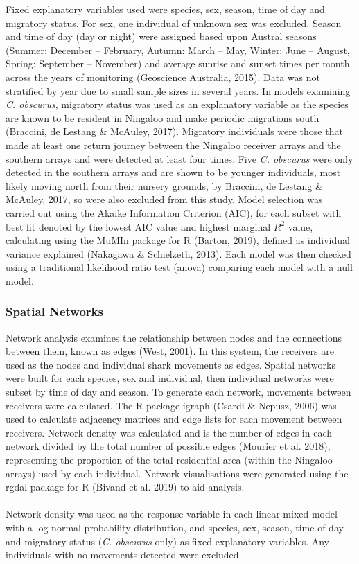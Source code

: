 \documentclass[11pt,a4paper]{article}
\begin{document}
	Fixed explanatory variables used were species, sex, season, time of day and migratory status. For sex, one individual of unknown sex was excluded. Season and time of day (day or night) were assigned based upon Austral seasons (Summer: December – February, Autumn: March – May, Winter: June – August, Spring: September – November) and average sunrise and sunset times per month across the years of monitoring (Geoscience Australia, 2015). Data was not stratified by year due to small sample sizes in several years. In models examining \textit{C. obscurus}, migratory status was used as an explanatory variable as the species are known to be resident in Ningaloo and make periodic migrations south (Braccini, de Lestang \& McAuley, 2017). Migratory individuals were those that made at least one return journey between the Ningaloo receiver arrays and the southern arrays and were detected at least four times. Five \textit{C. obscurus} were only detected in the southern arrays and are shown to be younger individuals, most likely moving north from their nursery grounds, by Braccini, de Lestang \& McAuley, 2017, so were also excluded from this study. Model selection was carried out using the Akaike Information Criterion (AIC), for each subset with best fit denoted by the lowest AIC value and highest marginal $R^2$ value, calculating using the MuMIn package for R (Barton, 2019), defined as individual variance explained (Nakagawa \& Schielzeth, 2013). Each model was then checked using a traditional likelihood ratio test (anova) comparing each model with a null model.\\
	
	
	\subsubsection{Spatial Networks}
	
	Network analysis examines the relationship between nodes and the connections between them, known as edges (West, 2001). In this system, the receivers are used as the nodes and individual shark movements as edges. Spatial networks were built for each species, sex and individual, then individual networks were subset by time of day and season. To generate each network, movements between receivers were calculated. The R package igraph (Csardi \& Nepusz, 2006) was used to calculate adjacency matrices and edge lists for each movement between receivers. Network density was calculated and is the number of edges in each network divided by the total number of possible edges (Mourier et al. 2018), representing the proportion of the total residential area (within the Ningaloo arrays) used by each individual. Network visualisations were generated using the rgdal package for R (Bivand et al. 2019) to aid analysis. \\
	\\
	Network density was used as the response variable in each linear mixed model with a log normal probability distribution, and species, sex, season, time of day and migratory status (\textit{C. obscurus} only) as fixed explanatory variables. Any individuals with no movements detected were excluded. \\
	
\end{document}
